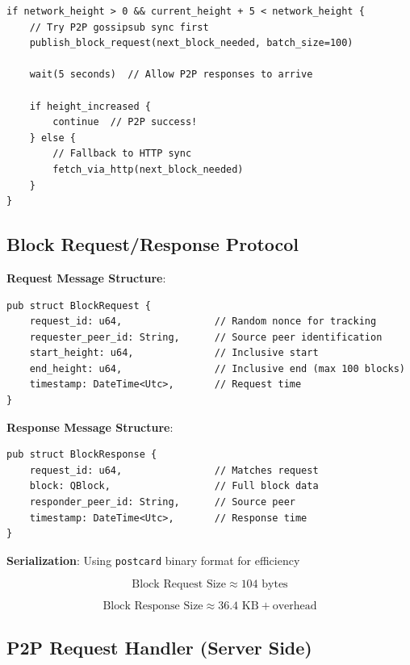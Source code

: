 \documentclass[11pt,a4paper]{article}
\begin{document}
\begin{verbatim}
if network_height > 0 && current_height + 5 < network_height {
    // Try P2P gossipsub sync first
    publish_block_request(next_block_needed, batch_size=100)

    wait(5 seconds)  // Allow P2P responses to arrive

    if height_increased {
        continue  // P2P success!
    } else {
        // Fallback to HTTP sync
        fetch_via_http(next_block_needed)
    }
}
\end{verbatim}

\subsection{Block Request/Response Protocol}

\textbf{Request Message Structure}:

\begin{verbatim}
pub struct BlockRequest {
    request_id: u64,                // Random nonce for tracking
    requester_peer_id: String,      // Source peer identification
    start_height: u64,              // Inclusive start
    end_height: u64,                // Inclusive end (max 100 blocks)
    timestamp: DateTime<Utc>,       // Request time
}
\end{verbatim}

\textbf{Response Message Structure}:

\begin{verbatim}
pub struct BlockResponse {
    request_id: u64,                // Matches request
    block: QBlock,                  // Full block data
    responder_peer_id: String,      // Source peer
    timestamp: DateTime<Utc>,       // Response time
}
\end{verbatim}

\textbf{Serialization}: Using \texttt{postcard} binary format for efficiency

\begin{equation}
\text{Block Request Size} \approx 104 \text{ bytes}
\end{equation}

\begin{equation}
\text{Block Response Size} \approx 36.4 \text{ KB} + \text{overhead}
\end{equation}

\subsection{P2P Request Handler (Server Side)}
\end{document}

